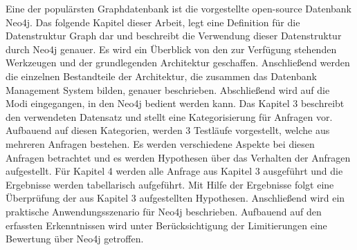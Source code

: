 Eine der populärsten Graphdatenbank ist die vorgestellte open-source Datenbank Neo4j\parencite{francis2018cypher}.  \newline 
Das folgende Kapitel dieser Arbeit, legt eine Definition für die Datenstruktur Graph dar und beschreibt die
Verwendung dieser Datenstruktur durch Neo4j genauer. Es wird
ein Überblick von den zur Verfügung stehenden Werkzeugen und der grundlegenden Architektur geschaffen. Anschließend werden die einzelnen Bestandteile der Architektur, die zusammen das Datenbank Management System bilden, genauer beschrieben. Abschließend wird auf die Modi eingegangen, in den Neo4j bedient werden
kann. \newline
Das Kapitel 3 beschreibt den verwendeten Datensatz und stellt eine Kategorisierung
für Anfragen vor. Aufbauend auf diesen Kategorien, werden 3 Testläufe vorgestellt, welche aus mehreren Anfragen bestehen. Es werden verschiedene Aspekte
bei diesen Anfragen betrachtet und es werden Hypothesen über das Verhalten der
Anfragen aufgestellt. \newline
Für Kapitel 4 werden alle Anfrage aus Kapitel 3 ausgeführt und die Ergebnisse werden tabellarisch aufgeführt. Mit Hilfe der Ergebnisse folgt eine Überprüfung der
aus Kapitel 3 aufgestellten Hypothesen. Anschließend wird ein praktische Anwendungsszenario für Neo4j beschrieben. Aufbauend auf den erfassten Erkenntnissen
wird unter Berücksichtigung der Limitierungen eine Bewertung über Neo4j getroffen.

